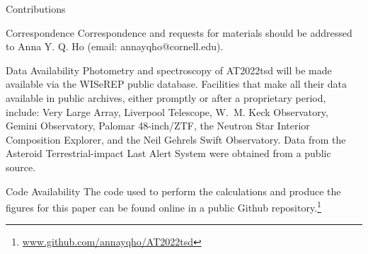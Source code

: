 \documentclass{nature_plusfigure}
\begin{document}
\begin{addendum}
\item[Contributions] 

 \item[Correspondence] Correspondence and requests for materials
should be addressed to Anna Y. Q. Ho (email: annayqho@cornell.edu).

 \item[Data Availability] Photometry and spectroscopy of AT2022tsd will be made available via the WISeREP public database. Facilities that make all their data available in public archives, either promptly or after a proprietary period, include: Very Large Array, Liverpool Telescope, W.~M. Keck Observatory, Gemini Observatory, Palomar 48-inch/ZTF, the Neutron Star Interior Composition Explorer, and the Neil Gehrels Swift Observatory. Data from the Asteroid Terrestrial-impact Last Alert System  were obtained from a public source.

 \item[Code Availability] The code used to perform the calculations and produce the figures for this paper can be found online in a public Github repository.\footnote{\url{www.github.com/annayqho/AT2022tsd}}

\end{addendum}


\clearpage
\newpage
\end{document}
